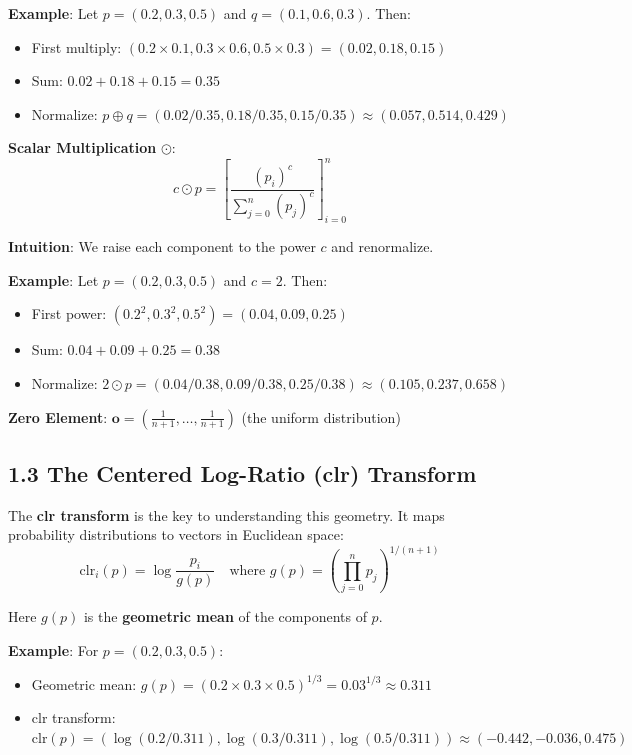 \documentclass{amsart}
\theoremstyle{plain}
\theoremstyle{definition}
\theoremstyle{remark}
\begin{document}
\textbf{Example}: Let $p = (0.2, 0.3, 0.5)$ and $q = (0.1, 0.6, 0.3)$. Then:

\begin{itemize}
	\item First multiply: $(0.2 \times 0.1, 0.3 \times 0.6, 0.5 \times 0.3) = (0.02, 0.18, 0.15)$
	\item Sum: $0.02 + 0.18 + 0.15 = 0.35$
	\item Normalize: $p \oplus q = (0.02/0.35, 0.18/0.35, 0.15/0.35) \approx (0.057, 0.514, 0.429)$
\end{itemize}

\textbf{Scalar Multiplication} $\odot$:
\[
c \odot p = \left[ \frac{(p_i)^c}{\sum_{j=0}^n (p_j)^c} \right]_{i=0}^n
\]

\textbf{Intuition}: We raise each component to the power $c$ and renormalize.

\textbf{Example}: Let $p = (0.2, 0.3, 0.5)$ and $c = 2$. Then:

\begin{itemize}
	\item First power: $(0.2^2, 0.3^2, 0.5^2) = (0.04, 0.09, 0.25)$
	\item Sum: $0.04 + 0.09 + 0.25 = 0.38$
	\item Normalize: $2 \odot p = (0.04/0.38, 0.09/0.38, 0.25/0.38) \approx (0.105, 0.237, 0.658)$
\end{itemize}

\textbf{Zero Element}: $\mathbf{o} = \left(\frac{1}{n+1}, \ldots, \frac{1}{n+1}\right)$ (the uniform distribution)

\subsection{1.3 The Centered Log-Ratio (clr) Transform}

The \textbf{clr transform} is the key to understanding this geometry. It maps probability distributions to vectors in Euclidean space:
\[
\text{clr}_i(p) = \log\frac{p_i}{g(p)} \quad \text{where } g(p) = \left(\prod_{j=0}^n p_j\right)^{1/(n+1)}
\]

Here $g(p)$ is the \textbf{geometric mean} of the components of $p$.

\textbf{Example}: For $p = (0.2, 0.3, 0.5)$:

\begin{itemize}
	\item Geometric mean: $g(p) = (0.2 \times 0.3 \times 0.5)^{1/3} = 0.03^{1/3} \approx 0.311$
	\item clr transform: $\text{clr}(p) = (\log(0.2/0.311), \log(0.3/0.311), \log(0.5/0.311)) \approx (-0.442, -0.036, 0.475)$
\end{itemize}
\end{document}
